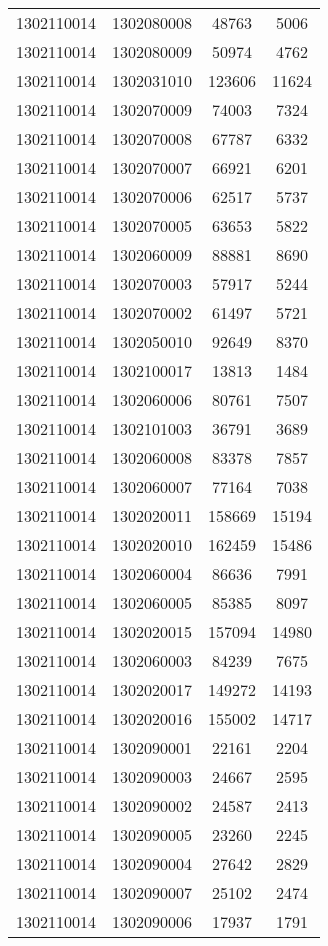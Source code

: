 \begin{longtable}{llcc}
1302110014 & 1302080008 & 48763 & 5006\\
1302110014 & 1302080009 & 50974 & 4762\\
1302110014 & 1302031010 & 123606 & 11624\\
1302110014 & 1302070009 & 74003 & 7324\\
1302110014 & 1302070008 & 67787 & 6332\\
1302110014 & 1302070007 & 66921 & 6201\\
1302110014 & 1302070006 & 62517 & 5737\\
1302110014 & 1302070005 & 63653 & 5822\\
1302110014 & 1302060009 & 88881 & 8690\\
1302110014 & 1302070003 & 57917 & 5244\\
1302110014 & 1302070002 & 61497 & 5721\\
1302110014 & 1302050010 & 92649 & 8370\\
1302110014 & 1302100017 & 13813 & 1484\\
1302110014 & 1302060006 & 80761 & 7507\\
1302110014 & 1302101003 & 36791 & 3689\\
1302110014 & 1302060008 & 83378 & 7857\\
1302110014 & 1302060007 & 77164 & 7038\\
1302110014 & 1302020011 & 158669 & 15194\\
1302110014 & 1302020010 & 162459 & 15486\\
1302110014 & 1302060004 & 86636 & 7991\\
1302110014 & 1302060005 & 85385 & 8097\\
1302110014 & 1302020015 & 157094 & 14980\\
1302110014 & 1302060003 & 84239 & 7675\\
1302110014 & 1302020017 & 149272 & 14193\\
1302110014 & 1302020016 & 155002 & 14717\\
1302110014 & 1302090001 & 22161 & 2204\\
1302110014 & 1302090003 & 24667 & 2595\\
1302110014 & 1302090002 & 24587 & 2413\\
1302110014 & 1302090005 & 23260 & 2245\\
1302110014 & 1302090004 & 27642 & 2829\\
1302110014 & 1302090007 & 25102 & 2474\\
1302110014 & 1302090006 & 17937 & 1791\\

\end{longtable}
